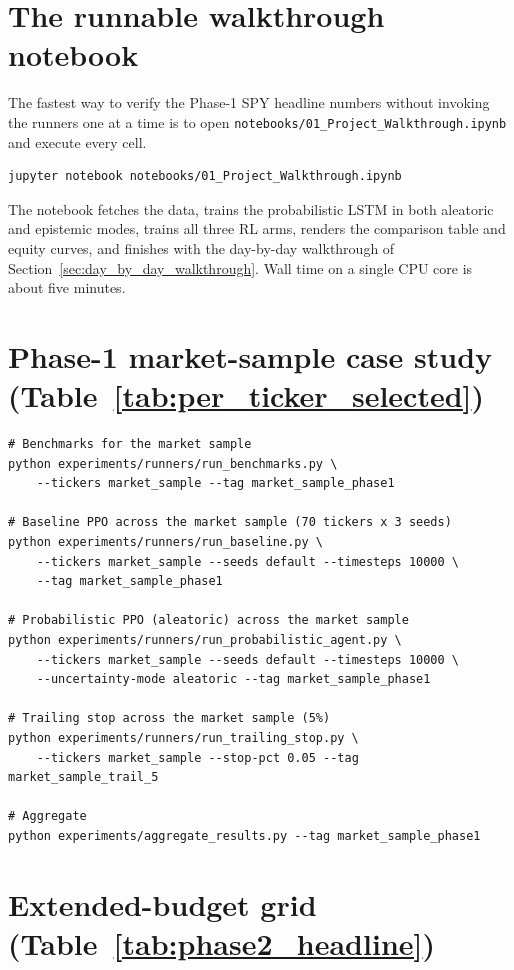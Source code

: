\section{The runnable walkthrough notebook}
\label{app:walkthrough_notebook}

The fastest way to verify the Phase-1 SPY headline numbers without invoking the runners one at a time is to open \texttt{notebooks/01\_Project\_Walkthrough.ipynb} and execute every cell.

\begin{verbatim}
jupyter notebook notebooks/01_Project_Walkthrough.ipynb
\end{verbatim}

The notebook fetches the data, trains the probabilistic LSTM in both aleatoric and epistemic modes, trains all three RL arms, renders the comparison table and equity curves, and finishes with the day-by-day walkthrough of Section~\ref{sec:day_by_day_walkthrough}. Wall time on a single CPU core is about five minutes.

\section{Phase-1 market-sample case study (Table~\ref{tab:per_ticker_selected})}
\label{app:phase1_market_sample}

\begin{verbatim}
# Benchmarks for the market sample
python experiments/runners/run_benchmarks.py \
    --tickers market_sample --tag market_sample_phase1

# Baseline PPO across the market sample (70 tickers x 3 seeds)
python experiments/runners/run_baseline.py \
    --tickers market_sample --seeds default --timesteps 10000 \
    --tag market_sample_phase1

# Probabilistic PPO (aleatoric) across the market sample
python experiments/runners/run_probabilistic_agent.py \
    --tickers market_sample --seeds default --timesteps 10000 \
    --uncertainty-mode aleatoric --tag market_sample_phase1

# Trailing stop across the market sample (5%)
python experiments/runners/run_trailing_stop.py \
    --tickers market_sample --stop-pct 0.05 --tag market_sample_trail_5

# Aggregate
python experiments/aggregate_results.py --tag market_sample_phase1
\end{verbatim}

\section{Extended-budget grid (Table~\ref{tab:phase2_headline})}
\label{app:extended_seed_stability}

